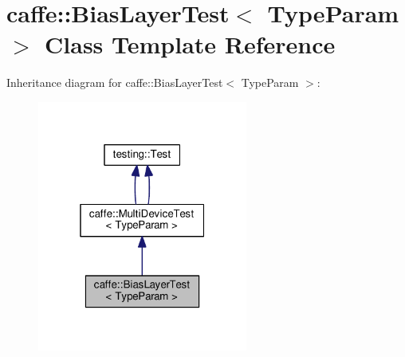 \hypertarget{classcaffe_1_1_bias_layer_test}{}\section{caffe\+:\+:Bias\+Layer\+Test$<$ Type\+Param $>$ Class Template Reference}
\label{classcaffe_1_1_bias_layer_test}


Inheritance diagram for caffe\+:\+:Bias\+Layer\+Test$<$ Type\+Param $>$\+:
\nopagebreak
\begin{figure}[H]
\begin{center}
\leavevmode
\includegraphics[width=196pt]{classcaffe_1_1_bias_layer_test__inherit__graph}
\end{center}
\end{figure}
